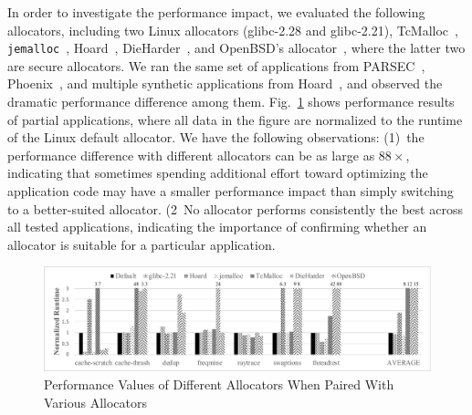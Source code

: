 In order to investigate the performance impact, we evaluated the following allocators, including two Linux allocators (glibc-2.28 and glibc-2.21), TcMalloc~\citep{tcmalloc}, \texttt{jemalloc}~\citep{jemalloc}, Hoard~\citep{Hoard}, DieHarder~\citep{DieHarder}, and OpenBSD's allocator~\citep{openbsd}, where the latter two are secure allocators. We ran the same set of applications from PARSEC~\citep{parsec}, Phoenix~\citep{phoenix}, and multiple synthetic applications from Hoard~\cite{Hoard}, and observed the dramatic performance difference among them. Fig.~\ref{fig:motivation} shows performance results of partial applications, where all data in the figure are normalized to the runtime of the Linux default allocator. We have the following observations: (1)~the performance difference with different allocators can be as large as $88\times$, indicating that sometimes spending additional effort toward optimizing the application code may have a smaller performance impact than simply switching to a better-suited allocator. (2~No allocator performs consistently the best across all tested applications, indicating the importance of confirming whether an allocator is suitable for a particular application. 



\begin{figure}[!ht]
\centering
\includegraphics[width=\columnwidth]{figures/regular-performance}
\caption{Performance Values of Different Allocators When Paired With Various Allocators\label{fig:motivation}}
\end{figure}



